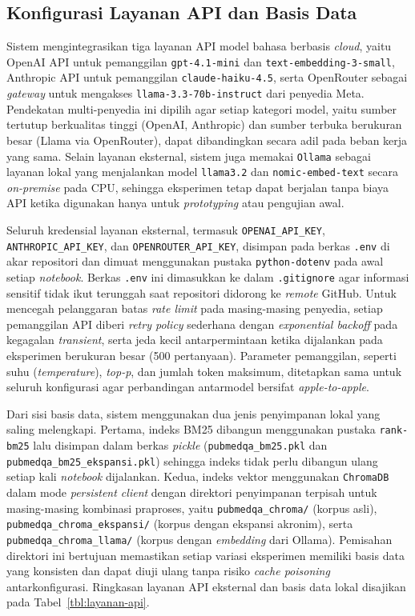\subsection{Konfigurasi Layanan API dan Basis Data}
\label{subsec:konfigurasi-api}

Sistem mengintegrasikan tiga layanan API model bahasa berbasis \textit{cloud}, yaitu OpenAI API untuk pemanggilan \texttt{gpt-4.1-mini} dan \texttt{text-embedding-3-small}, Anthropic API untuk pemanggilan \texttt{claude-haiku-4.5}, serta OpenRouter sebagai \textit{gateway} untuk mengakses \texttt{llama-3.3-70b-instruct} dari penyedia Meta. Pendekatan multi-penyedia ini dipilih agar setiap kategori model, yaitu sumber tertutup berkualitas tinggi (OpenAI, Anthropic) dan sumber terbuka berukuran besar (Llama via OpenRouter), dapat dibandingkan secara adil pada beban kerja yang sama. Selain layanan eksternal, sistem juga memakai \texttt{Ollama} sebagai layanan lokal yang menjalankan model \texttt{llama3.2} dan \texttt{nomic-embed-text} secara \textit{on-premise} pada CPU, sehingga eksperimen tetap dapat berjalan tanpa biaya API ketika digunakan hanya untuk \textit{prototyping} atau pengujian awal.

Seluruh kredensial layanan eksternal, termasuk \texttt{OPENAI\_API\_KEY}, \texttt{ANTHROPIC\_API\_KEY}, dan \texttt{OPENROUTER\_API\_KEY}, disimpan pada berkas \texttt{.env} di akar repositori dan dimuat menggunakan pustaka \texttt{python-dotenv} pada awal setiap \textit{notebook}. Berkas \texttt{.env} ini dimasukkan ke dalam \texttt{.gitignore} agar informasi sensitif tidak ikut terunggah saat repositori didorong ke \textit{remote} GitHub. Untuk mencegah pelanggaran batas \textit{rate limit} pada masing-masing penyedia, setiap pemanggilan API diberi \textit{retry policy} sederhana dengan \textit{exponential backoff} pada kegagalan \textit{transient}, serta jeda kecil antarpermintaan ketika dijalankan pada eksperimen berukuran besar (500 pertanyaan). Parameter pemanggilan, seperti suhu (\textit{temperature}), \textit{top-p}, dan jumlah token maksimum, ditetapkan sama untuk seluruh konfigurasi agar perbandingan antarmodel bersifat \textit{apple-to-apple}.

Dari sisi basis data, sistem menggunakan dua jenis penyimpanan lokal yang saling melengkapi. Pertama, indeks BM25 dibangun menggunakan pustaka \texttt{rank-bm25} lalu disimpan dalam berkas \textit{pickle} (\texttt{pubmedqa\_bm25.pkl} dan \texttt{pubmedqa\_bm25\_ekspansi.pkl}) sehingga indeks tidak perlu dibangun ulang setiap kali \textit{notebook} dijalankan. Kedua, indeks vektor menggunakan \texttt{ChromaDB} dalam mode \textit{persistent client} dengan direktori penyimpanan terpisah untuk masing-masing kombinasi praproses, yaitu \texttt{pubmedqa\_chroma/} (korpus asli), \texttt{pubmedqa\_chroma\_ekspansi/} (korpus dengan ekspansi akronim), serta \texttt{pubmedqa\_chroma\_llama/} (korpus dengan \textit{embedding} dari Ollama). Pemisahan direktori ini bertujuan memastikan setiap variasi eksperimen memiliki basis data yang konsisten dan dapat diuji ulang tanpa risiko \textit{cache poisoning} antarkonfigurasi. Ringkasan layanan API eksternal dan basis data lokal disajikan pada Tabel~\ref{tbl:layanan-api}.

